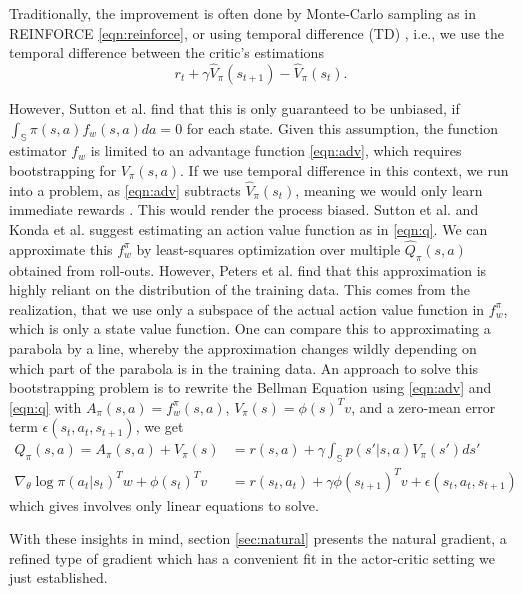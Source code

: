 Traditionally, the improvement is often done by Monte-Carlo sampling as in REINFORCE \eqref{eqn:reinforce}, or using temporal difference (TD) \cite{Sutton1988}, i.e., we use the temporal difference between the critic's estimations 
\begin{equation}
  r_t + \gamma \hat{V}_\pi(s_{t+1}) - \hat{V}_\pi(s_t).
\end{equation}

However, Sutton et al. \cite{1993b} find that this is only guaranteed to be unbiased, if $\int_\mathbb{S}{\pi(s,a)f_w(s,a)da} = 0$ for each state. 
Given this assumption, the function estimator $f_w$ is limited to an advantage function \eqref{eqn:adv}, which requires bootstrapping for $V_\pi(s,a)$. 
If we use temporal difference in this context, we run into a problem, as \eqref{eqn:adv} subtracts $\hat{V}_\pi(s_t)$, meaning we would only learn immediate rewards \cite{Peters_IICHR_2003}. 
This would render the process biased. 
Sutton et al. \cite{Sutton:1999:PGM:3009657.3009806} and Konda et al. \cite{NIPS1999_1786} suggest estimating an action value function as in \eqref{eqn:q}. 
We can approximate this $f_w^\pi$ by least-squares optimization over multiple $\hat{Q}_\pi(s,a)$ obtained from roll-outs. 
However, Peters et al. \cite{4863} find that this approximation is highly reliant on the distribution of the training data. 
This comes from the realization, that we use only a subspace of the actual action value function in $f_w^\pi$, which is only a state value function. 
One can compare this to approximating a parabola by a line, whereby the approximation changes wildly depending on which part of the parabola is in the training data. 
An approach to solve this bootstrapping problem is to rewrite the Bellman Equation using \eqref{eqn:adv} and \eqref{eqn:q} with $A_\pi(s,a) = f_w^\pi(s,a)$, $V_\pi(s) = \phi(s)^T v$, and a zero-mean error term $\epsilon(s_t,a_t,s_{t+1})$, we get
\begin{align}
  Q_\pi(s,a) = A_\pi(s,a) + V_\pi(s) &= r(s,a) + \gamma \int_\mathbb{S} p(s'|s,a)V_\pi(s')ds' \\
  \nabla_\theta \log \pi(a_t|s_t)^T w + \phi(s_t)^T v &= r(s_t,a_t) + \gamma \phi(s_{t+1})^T v + \epsilon(s_t,a_t,s_{t+1})
\end{align}
which gives involves only linear equations to solve. \cite{4863} 

With these insights in mind, section \ref{sec:natural} presents the natural gradient, a refined type of gradient which has a convenient fit in the actor-critic setting we just established.

